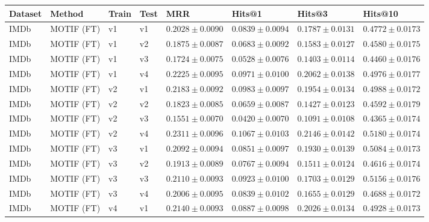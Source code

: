 \begin{table}[htbp]
\centering
\small
\renewcommand{\arraystretch}{1.15}
\setlength{\tabcolsep}{5pt}
\begin{adjustbox}{max width=\linewidth}
\begin{tabular}{|l|l|l|l|l|l|l|l|}
\hline
\textbf{Dataset} & \textbf{Method} & \textbf{Train} & \textbf{Test} & \textbf{MRR} & \textbf{Hits@1} & \textbf{Hits@3} & \textbf{Hits@10} \\
\hline
IMDb & MOTIF (FT) & v1 & v1 & $0.2028 \pm 0.0090$ & $0.0839 \pm 0.0094$ & $0.1787 \pm 0.0131$ & $0.4772 \pm 0.0173$ \\
\hline
IMDb & MOTIF (FT) & v1 & v2 & $0.1875 \pm 0.0087$ & $0.0683 \pm 0.0092$ & $0.1583 \pm 0.0127$ & $0.4580 \pm 0.0175$ \\
\hline
IMDb & MOTIF (FT) & v1 & v3 & $0.1724 \pm 0.0075$ & $0.0528 \pm 0.0076$ & $0.1403 \pm 0.0114$ & $0.4460 \pm 0.0176$ \\
\hline
IMDb & MOTIF (FT) & v1 & v4 & $0.2225 \pm 0.0095$ & $0.0971 \pm 0.0100$ & $0.2062 \pm 0.0138$ & $0.4976 \pm 0.0177$ \\
\hline
IMDb & MOTIF (FT) & v2 & v1 & $0.2183 \pm 0.0092$ & $0.0983 \pm 0.0097$ & $0.1954 \pm 0.0134$ & $0.4988 \pm 0.0172$ \\
\hline
IMDb & MOTIF (FT) & v2 & v2 & $0.1823 \pm 0.0085$ & $0.0659 \pm 0.0087$ & $0.1427 \pm 0.0123$ & $0.4592 \pm 0.0179$ \\
\hline
IMDb & MOTIF (FT) & v2 & v3 & $0.1551 \pm 0.0070$ & $0.0420 \pm 0.0070$ & $0.1091 \pm 0.0108$ & $0.4365 \pm 0.0174$ \\
\hline
IMDb & MOTIF (FT) & v2 & v4 & $0.2311 \pm 0.0096$ & $0.1067 \pm 0.0103$ & $0.2146 \pm 0.0142$ & $0.5180 \pm 0.0174$ \\
\hline
IMDb & MOTIF (FT) & v3 & v1 & $0.2092 \pm 0.0094$ & $0.0851 \pm 0.0097$ & $0.1930 \pm 0.0139$ & $0.5084 \pm 0.0173$ \\
\hline
IMDb & MOTIF (FT) & v3 & v2 & $0.1913 \pm 0.0089$ & $0.0767 \pm 0.0094$ & $0.1511 \pm 0.0124$ & $0.4616 \pm 0.0174$ \\
\hline
IMDb & MOTIF (FT) & v3 & v3 & $0.2110 \pm 0.0093$ & $0.0923 \pm 0.0100$ & $0.1703 \pm 0.0129$ & $0.5156 \pm 0.0176$ \\
\hline
IMDb & MOTIF (FT) & v3 & v4 & $0.2006 \pm 0.0095$ & $0.0839 \pm 0.0102$ & $0.1655 \pm 0.0129$ & $0.4688 \pm 0.0172$ \\
\hline
IMDb & MOTIF (FT) & v4 & v1 & $0.2140 \pm 0.0093$ & $0.0887 \pm 0.0098$ & $0.2026 \pm 0.0134$ & $0.4928 \pm 0.0173$ \\

\end{tabular}
\end{adjustbox}
\end{table}
